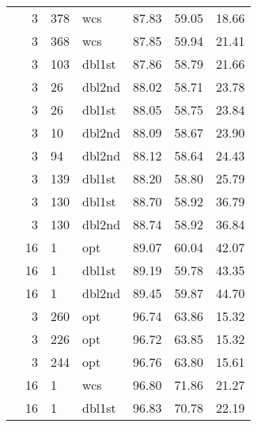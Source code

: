 \begin{tabular}{cr@{.}lllll}
	  & 3      & 378   & wcs    & 87.83      & 59.05          & 18.66 \\ 
	  & 3      & 368   & wcs    & 87.85      & 59.94          & 21.41 \\ 
	  & 3      & 103   & dbl1st & 87.86      & 58.79          & 21.66 \\ 
	  & 3      & 26    & dbl2nd & 88.02      & 58.71          & 23.78 \\ 
	  & 3      & 26    & dbl1st & 88.05      & 58.75          & 23.84 \\ 
	  & 3      & 10    & dbl2nd & 88.09      & 58.67          & 23.90 \\ 
	  & 3      & 94    & dbl2nd & 88.12      & 58.64          & 24.43 \\ 
	  & 3      & 139   & dbl1st & 88.20      & 58.80          & 25.79 \\ 
	  & 3      & 130   & dbl1st & 88.70      & 58.92          & 36.79 \\ 
	  & 3      & 130   & dbl2nd & 88.74      & 58.92          & 36.84 \\ 
	  & 16     & 1     & opt    & 89.07      & 60.04          & 42.07 \\ 
	  & 16     & 1     & dbl1st & 89.19      & 59.78          & 43.35 \\ 
	  & 16     & 1     & dbl2nd & 89.45      & 59.87          & 44.70 \\ 
	\midrule \multirow{5}{*}{\frnd{10}{10}} 
	  & 3      & 260   & opt    & 96.74      & 63.86          & 15.32 \\ 
	  & 3      & 226   & opt    & 96.72      & 63.85          & 15.32 \\ 
	  & 3      & 244   & opt    & 96.76      & 63.80          & 15.61 \\ 
	  & 16     & 1     & wcs    & 96.80      & 71.86          & 21.27 \\ 
	  & 16     & 1     & dbl1st & 96.83      & 70.78          & 22.19 \\ 
	\bottomrule
\end{tabular}
